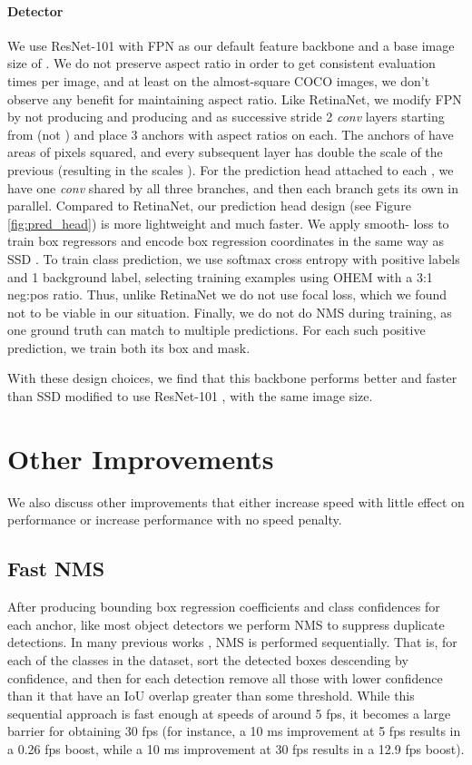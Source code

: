 \documentclass[10pt,journal,compsoc]{IEEEtran}
\begin{document}
\paragraph{\methodname{} Detector}
We use ResNet-101 \cite{resnet} with FPN \cite{fpn} as our default feature backbone and a base image size of . We do not preserve aspect ratio in order to get consistent evaluation times per image, and at least on the almost-square COCO images, we don't observe any benefit for maintaining aspect ratio. Like RetinaNet, we modify FPN by not producing  and producing  and  as successive  stride 2 \textit{conv} layers starting from  (not ) and place 3 anchors with aspect ratios  on each. The anchors of  have areas of  pixels squared, and every subsequent layer has double the scale of the previous (resulting in the scales ). For the prediction head attached to each , we have one  \textit{conv} shared by all three branches, and then each branch gets its own   in parallel. Compared to RetinaNet, our prediction head design (see Figure \ref{fig:pred_head}) is more lightweight and much faster. We apply smooth- loss to train box regressors and encode box regression coordinates in the same way as SSD \cite{ssd}. To train class prediction, we use softmax cross entropy with  positive labels and 1 background label, selecting training examples using OHEM \cite{ohem} with a 3:1 neg:pos ratio. Thus, unlike RetinaNet we do not use focal loss, which we found not to be viable in our situation. Finally, we do not do NMS during training, as one ground truth can match to multiple predictions. For each such positive prediction, we train both its box and mask.



With these design choices, we find that this backbone performs better and faster than SSD \cite{ssd} modified to use ResNet-101 \cite{resnet}, with the same image size.

\section{Other Improvements}
We also discuss other improvements that either increase speed with little effect on performance or increase performance with no speed penalty.

\subsection{Fast NMS}
After producing bounding box regression coefficients and class confidences for each anchor, like most object detectors we perform NMS to suppress duplicate detections. In many previous works \cite{yolov2, yolov3, ssd, fasterrcnn, maskrcnn, retinanet}, NMS is performed sequentially. That is, for each of the  classes in the dataset, sort the detected boxes descending by confidence, and then for each detection remove all those with lower confidence than it that have an IoU overlap greater than some threshold. While this sequential approach is fast enough at speeds of around 5 fps, it becomes a large barrier for obtaining 30 fps (for instance, a 10 ms improvement at 5 fps results in a 0.26 fps boost, while a 10 ms improvement at 30 fps results in a 12.9 fps boost).
\end{document}
